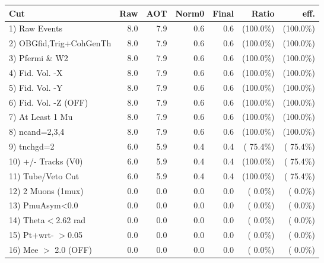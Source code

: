  \begin{table}[h!]\centering
 \begin{tabular}{||l||r|r|r|r|r|r||}
 \hline
 \hline
 Cut & Raw & AOT & Norm0 & Final & Ratio & eff.       \\
 \hline
  1) Raw Events           &          8.0 &          7.9 &          0.6 &          0.6 & (100.0\%) & (100.0\%) \\
  2) OBGfid,Trig+CohGenTh &          8.0 &          7.9 &          0.6 &          0.6 & (100.0\%) & (100.0\%) \\
  3) Pfermi \& W2         &          8.0 &          7.9 &          0.6 &          0.6 & (100.0\%) & (100.0\%) \\
  4) Fid. Vol. -X         &          8.0 &          7.9 &          0.6 &          0.6 & (100.0\%) & (100.0\%) \\
  5) Fid. Vol. -Y         &          8.0 &          7.9 &          0.6 &          0.6 & (100.0\%) & (100.0\%) \\
  6) Fid. Vol. -Z (OFF)   &          8.0 &          7.9 &          0.6 &          0.6 & (100.0\%) & (100.0\%) \\
  7) At Least 1 Mu        &          8.0 &          7.9 &          0.6 &          0.6 & (100.0\%) & (100.0\%) \\
  8) ncand=2,3,4          &          8.0 &          7.9 &          0.6 &          0.6 & (100.0\%) & (100.0\%) \\
  9) tnchgd=2             &          6.0 &          5.9 &          0.4 &          0.4 & ( 75.4\%) & ( 75.4\%) \\
 10) +/- Tracks (V0)      &          6.0 &          5.9 &          0.4 &          0.4 & (100.0\%) & ( 75.4\%) \\
 11) Tube/Veto Cut        &          6.0 &          5.9 &          0.4 &          0.4 & (100.0\%) & ( 75.4\%) \\
 12) 2 Muons (1mux)       &          0.0 &          0.0 &          0.0 &          0.0 & (  0.0\%) & (  0.0\%) \\
 13) PmuAsym<0.0          &          0.0 &          0.0 &          0.0 &          0.0 & (  0.0\%) & (  0.0\%) \\
 14) Theta$<$2.62 rad     &          0.0 &          0.0 &          0.0 &          0.0 & (  0.0\%) & (  0.0\%) \\
 15) Pt+wrt- $>$0.05      &          0.0 &          0.0 &          0.0 &          0.0 & (  0.0\%) & (  0.0\%) \\
 16) Mee $>$ 2.0  (OFF)   &          0.0 &          0.0 &          0.0 &          0.0 & (  0.0\%) & (  0.0\%) \\

\end{tabular}
\end{table}
